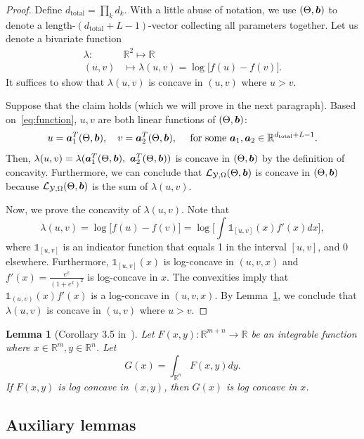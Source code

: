 \documentclass[11pt]{article}
\theoremstyle{plain}
\newtheorem{lem}{Lemma}
\theoremstyle{definition}
\begin{document}
\begin{proof}
Define $d_{\text{total}}=\prod_k d_k$. With a little abuse of notation, we use $(\Theta,\bm{b})$ to denote a length-$(d_{\text{total}}+L-1)$-vector collecting all parameters together. Let us denote a bivariate function
\begin{align}
\lambda: &\mathbb{R}^2\mapsto \mathbb{R}\\
(u,v)&\mapsto\lambda(u,v) = \log \big[f(u)-  f(v)\big].
\end{align}
It suffices to show that $\lambda(u,v)$ is concave in $(u,v)$ where $u>v$.

Suppose that the claim holds (which we will prove in the next paragraph). Based on~\eqref{eq:function}, $u,v$ are both linear functions of $(\Theta,\bm{b})$:
\[
u = \bm{a}_1^T(\Theta,\bm{b}), \quad v = \bm{a}_2^T(\Theta,\bm{b}), \quad \text{ for some}\ \bm{a}_1,\bm{a}_2\in \mathbb{R}^{d_{\text{total}}+L-1}.
\]
Then, $\lambda(u,v) = \lambda(\ma_1^T(\Theta,\mb),\ \ma_2^T(\Theta,\mb))$ is concave in $(\Theta,\bm{b})$ by the definition of concavity. Furthermore, we can conclude that $\mathcal{L}_{\mathcal{Y},\Omega}(\Theta, \bm{b}) $ is concave in $(\Theta,\bm{b})$ because $\mathcal{L}_{\mathcal{Y},\Omega}(\Theta, \bm{b})$ is the sum of $\lambda(u,v)$.

Now, we prove the concavity of $\lambda(u,v)$. Note that
\begin{equation*}
\lambda(u,v) = \log\big[f(u)-f(v)\big]=\log\big[\int\mathds{1}_{[u,v]}(x)f'(x)dx\big],
\end{equation*}
where $\mathds{1}_{[u,v]}$ is an indicator function that equals 1 in the interval $[u,v]$, and 0 elsewhere. Furthermore, $\mathds{1}_{[u,v]}(x)$ is log-concave in $(u,v,x)$ and $f'(x) = \frac{e^x}{(1+e^x)^2}$ is log-concave in $x$. The convexities imply that $\mathds{1}_{(u,v)}(x)f'(x)$
is a log-concave in $(u,v,x)$. By Lemma~\ref{lem:lossconvexity}, we conclude that $\lambda(u,v)$ is concave in $(u,v)$ where $u>v$.
\end{proof}

\begin{lem}[Corollary 3.5 in~\cite{brascamp2002extensions}]\label{lem:lossconvexity}
Let $F(x,y):\mathbb{R}^{m+n}\rightarrow \mathbb{R}$ be an integrable function where $x\in \mathbb{R}^{m},y\in \mathbb{R}^n$. Let
\[
G(x) = \int_{\mathbb{R}^n}F(x,y)dy.
\]
If $F(x,y)$ is log concave in $(x,y)$, then $G(x)$ is log concave in $x$.
\end{lem}


\subsection{Auxiliary lemmas}
\label{sec:lemma}
\end{document}
